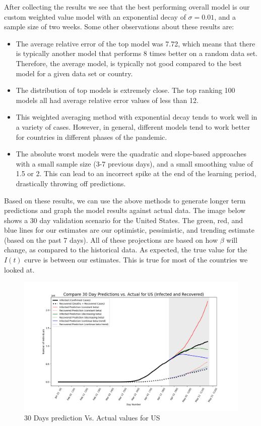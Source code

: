 \documentclass[11pt]{article}
\begin{document}
After collecting the results we see that the best performing overall model is our custom weighted value model with an exponential decay of $\sigma=0.01$, and a sample size of two weeks. Some other observations about these results are:
\begin{itemize}
    \item The average relative error of the top model was 7.72, which means that there is typically another model that performs 8 times better on a random data set. Therefore, the average model, is typically not good compared to the best model for a given data set or country.
    \item The distribution of top models is extremely close. The top ranking 100 models all had average relative error values of less than 12.
    \item This weighted averaging method with exponential decay tends to work well in a variety of cases. However, in general, different models tend to work better for countries in different phases of the pandemic.
    \item The absolute worst models were the quadratic and slope-based approaches with a small sample size (3-7 previous days), and a small smoothing value of 1.5 or 2. This can lead to an incorrect spike at the end of the learning period, drastically throwing off predictions.
\end{itemize}

Based on these results, we can use the above methods to generate longer term predictions and graph the model results against actual data. The image below shows a 30 day validation scenario for the United States. The green, red, and blue lines for our estimates are our optimistic, pessimistic, and trending estimate (based on the past 7 days). All of these projections are based on how $\beta$ will change, as compared to the historical data. As expected, the true value for the $I(t)$ curve is between our estimates. This is true for most of the countries we looked at.

\begin{figure}[h]
    \includegraphics[width=16cm]{images/30-days-prediction-vs-actual-US.png}
    \centering
    \caption{30 Days prediction Vs. Actual values for US}
    \label{fig:30-days-prediction-vs-actual-value}
\end{figure}
\end{document}
